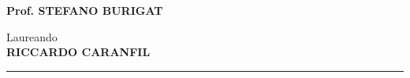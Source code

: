 \begin{titlepage}
{\begin{minipage}[t]{0.47\textwidth}
{    \vspace{2mm}
    {\bf Prof. STEFANO BURIGAT}}
\end{minipage}
\hfill
\begin{minipage}[t]{0.47\textwidth}\raggedleft
    \vspace{10mm}
    {\large{\sc Laureando}\\
    \vspace{2mm}
    {\bf RICCARDO CARANFIL}}
\end{minipage}
}
\vspace{18mm}
\begin{center}
    {\rule[0.2cm]{5cm}{0.3mm}\\
    \large{}}
\end{center}
\end{titlepage}
\restoregeometry
